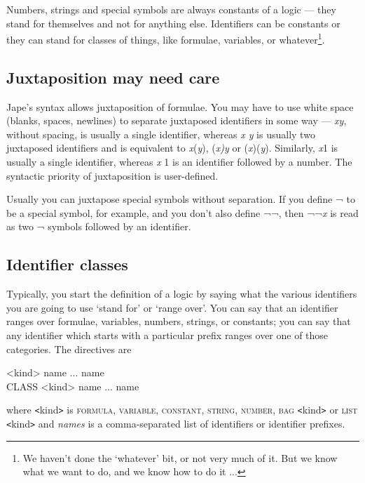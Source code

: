 Numbers, strings and special symbols are always constants of a logic --- they stand for themselves and not for anything else. Identifiers can be constants or they can stand for classes of things, like formulae, variables, or whatever\footnote{We haven't done the `whatever' bit, or not very much of it. But we know what we want to do, and we know how to do it ...}.

\subsection{Juxtaposition may need care}

Jape's syntax allows juxtaposition of formulae. You may have to use white space (blanks, spaces, newlines) to separate juxtaposed identifiers in some way --- \textit{xy}, without spacing, is usually a single identifier, whereas \textit{x y} is usually two juxtaposed identifiers and is equivalent to \textit{x}(\textit{y}), (\textit{x)y} or (\textit{x})(\textit{y}). Similarly, \textit{x}1 is usually a single identifier, whereas \textit{x} 1 is an identifier followed by a number. The syntactic priority of juxtaposition is user-defined.

Usually you can juxtapose special symbols without separation. If you define ¬ to be a special symbol, for example, and you don't also define ¬¬, then ¬¬\textit{x} is read as two ¬ symbols followed by an identifier.

\subsection{Identifier classes}

Typically, you start the definition of a logic by saying what the various identifiers you are going to use `stand for' or `range over'. You can say that an identifier ranges over formulae, variables, numbers, strings, or constants; you can say that any identifier which starts with a particular prefix ranges over one of those categories. The directives are

\begin{japeish}
<kind> name ... name \\
CLASS <kind> name ... name
\end{japeish}

where \texttt{<}kind\texttt{>} is \textsc{formula, variable}, \textsc{constant, string}, \textsc{number}, \textsc{bag} \texttt{<}kind\texttt{>} or \textsc{list} \texttt{<}kind\texttt{>} and \textit{names} is a comma-separated list of identifiers or identifier prefixes.

